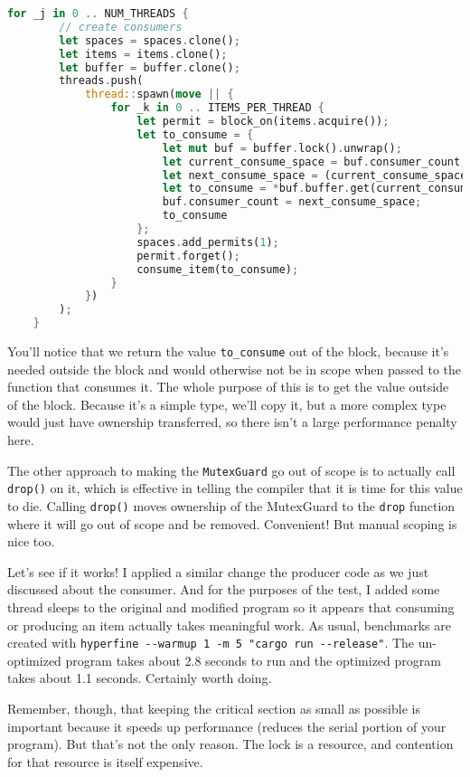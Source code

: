 \begin{lstlisting}[language=Rust]
    for _j in 0 .. NUM_THREADS {
        // create consumers
        let spaces = spaces.clone();
        let items = items.clone();
        let buffer = buffer.clone();
        threads.push(
            thread::spawn(move || {
                for _k in 0 .. ITEMS_PER_THREAD {
                    let permit = block_on(items.acquire());
                    let to_consume = {
                        let mut buf = buffer.lock().unwrap();
                        let current_consume_space = buf.consumer_count;
                        let next_consume_space = (current_consume_space + 1) % buf.buffer.len();
                        let to_consume = *buf.buffer.get(current_consume_space).unwrap();
                        buf.consumer_count = next_consume_space;
                        to_consume
                    };
                    spaces.add_permits(1);
                    permit.forget();
                    consume_item(to_consume);
                }
            })
        );
    }
\end{lstlisting}

You'll notice that we return the value \texttt{to\_consume} out of the block, because it's needed outside the block and would otherwise not be in scope when passed to the function that consumes it. The whole purpose of this is to get the value outside of the block. Because it's a simple type, we'll copy it, but a more complex type would just have ownership transferred, so there isn't a large performance penalty here.

The other approach to making the \texttt{MutexGuard} go out of scope is to actually call \texttt{drop()} on it, which is effective in telling the compiler that it is time for this value to die. Calling \texttt{drop()} moves ownership of the MutexGuard to the \texttt{drop} function where it will go out of scope and be removed. Convenient! But manual scoping is nice too.

Let's see if it works! I applied a similar change the producer code as we just discussed about the consumer. And for the purposes of the test, I added some thread sleeps to the original and modified program so it appears that consuming or producing an item actually takes meaningful work. As usual, benchmarks are created with \verb+hyperfine --warmup 1 -m 5 "cargo run --release"+. The un-optimized program takes about 2.8 seconds to run and the optimized program takes about 1.1 seconds. Certainly worth doing.

Remember, though, that keeping the critical section as small as possible is important because it speeds up performance (reduces the serial portion of your program). But that's not the only reason. The lock is a resource, and contention for that resource is itself expensive.


